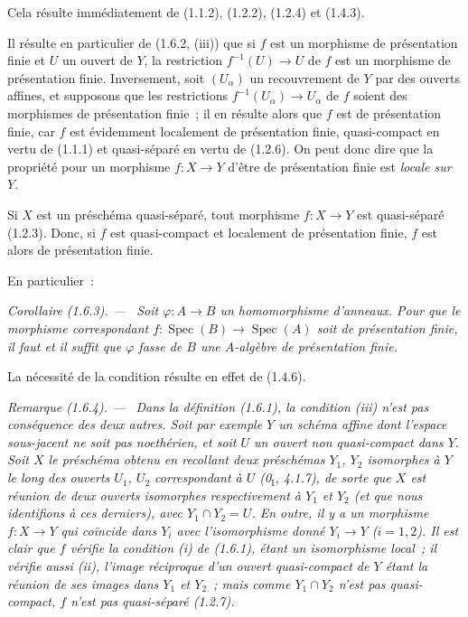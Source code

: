 \documentclass[10pt,oneside]{book}
\makeatletter
\newcommand{\setmanualcurrentlabel}[1]{\def\@currentlabel{#1}}
\newenvironment{corollary}[1][]{%
  \setmanualcurrentlabel{#1}\par\medskip\noindent\itshape Corollaire (#1). ---\ }{\par}
\newenvironment{remark}[1][]{%
  \setmanualcurrentlabel{#1}\par\medskip\noindent\itshape Remarque (#1). ---\ }{\par}
\makeatother
\begin{document}
Cela résulte immédiatement de (1.1.2), (1.2.2), (1.2.4) et (1.4.3).

Il résulte en particulier de (1.6.2, (iii)) que si $f$ est un morphisme de
présentation finie et $U$ un ouvert de $Y$, la restriction
$f^{-1}(U)\to U$ de $f$ est un morphisme de présentation finie. Inversement,
soit $(U_\alpha)$ un recouvrement de $Y$ par des ouverts affines, et supposons
que les restrictions $f^{-1}(U_\alpha)\to U_\alpha$ de $f$ soient des
morphismes de présentation finie~; il en résulte alors que $f$ est de
présentation finie, car $f$ est évidemment localement de présentation finie,
quasi-compact en vertu de (1.1.1) et quasi-séparé en vertu de (1.2.6). On peut
donc dire que la propriété pour un morphisme $f:X\to Y$ d'être de présentation
finie est \emph{locale sur $Y$}.

Si $X$ est un préschéma quasi-séparé, tout morphisme $f:X\to Y$ est
quasi-séparé (1.2.3). Donc, si $f$ est quasi-compact et localement de
présentation finie, $f$ est alors de présentation finie.

En particulier~:

\begin{corollary}[1.6.3]
\label{IV.1.6.3-fr}
Soit $\varphi:A\to B$ un homomorphisme d'anneaux. Pour que le morphisme
correspondant $f:\operatorname{Spec}(B)\to\operatorname{Spec}(A)$ soit de présentation finie, il faut et
il suffit que $\varphi$ fasse de $B$ une $A$-algèbre de présentation finie.
\end{corollary}

La nécessité de la condition résulte en effet de (1.4.6).

\begin{remark}[1.6.4]
\label{IV.1.6.4-fr}
Dans la définition (1.6.1), la condition (iii) n'est pas conséquence des deux
autres. Soit par exemple $Y$ un schéma affine dont l'espace sous-jacent ne
soit pas noethérien, et soit $U$ un ouvert non quasi-compact dans $Y$. Soit
$X$ le préschéma obtenu en recollant deux préschémas $Y_1$, $Y_2$ isomorphes à
$Y$ le long des ouverts $U_1$, $U_2$ correspondant à $U$ (0$_{\mathrm I}$,
4.1.7), de sorte que $X$ est réunion de deux ouverts isomorphes respectivement
à $Y_1$ et $Y_2$ (et que nous identifions à ces derniers), avec
$Y_1\cap Y_2=U$. En outre, il y a un morphisme $f:X\to Y$ qui coïncide dans
$Y_i$ avec l'isomorphisme donné $Y_i\to Y$ ($i=1,2$). Il est clair que $f$
vérifie la condition (i) de (1.6.1), étant un isomorphisme local~; il vérifie
aussi (ii), l'image réciproque d'un ouvert quasi-compact de $Y$ étant la
réunion de ses images dans $Y_1$ et $Y_2$~; mais comme $Y_1\cap Y_2$ n'est pas
quasi-compact, $f$ n'est pas quasi-séparé (1.2.7).
\end{remark}
\end{document}

